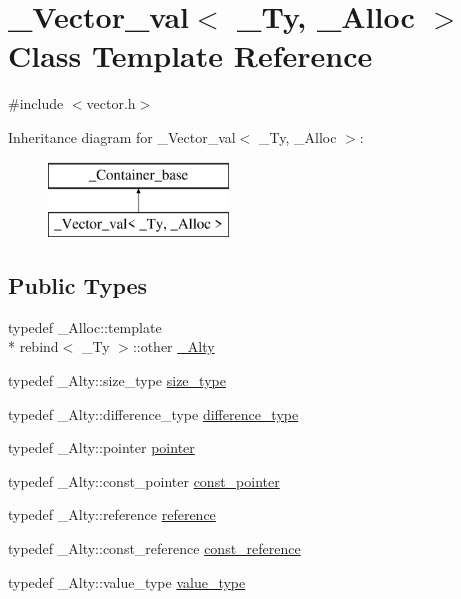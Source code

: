 \hypertarget{class___vector__val}{\section{\+\_\+\+Vector\+\_\+val$<$ \+\_\+\+Ty, \+\_\+\+Alloc $>$ Class Template Reference}
\label{class___vector__val}
}


{\ttfamily \#include $<$vector.\+h$>$}

Inheritance diagram for \+\_\+\+Vector\+\_\+val$<$ \+\_\+\+Ty, \+\_\+\+Alloc $>$\+:\begin{figure}[H]
\begin{center}
\leavevmode
\includegraphics[height=2.000000cm]{class___vector__val}
\end{center}
\end{figure}
\subsection*{Public Types}
\begin{DoxyCompactItemize}
\item 
typedef \+\_\+\+Alloc\+::template \\*
rebind$<$ \+\_\+\+Ty $>$\+::other \hyperlink{class___vector__val_ad273d1146bf265f65e75133aa2f9986a}{\+\_\+\+Alty}
\item 
typedef \+\_\+\+Alty\+::size\+\_\+type \hyperlink{class___vector__val_a46109be8e2eefdf86304a44e05074941}{size\+\_\+type}
\item 
typedef \+\_\+\+Alty\+::difference\+\_\+type \hyperlink{class___vector__val_ac80d6a645f27bc921bf30f5b0acdffb4}{difference\+\_\+type}
\item 
typedef \+\_\+\+Alty\+::pointer \hyperlink{class___vector__val_ae6cca5a50b243bc20bd27fa8f620d63e}{pointer}
\item 
typedef \+\_\+\+Alty\+::const\+\_\+pointer \hyperlink{class___vector__val_ab8b3d3a2093e4799ac46bf479e8789bb}{const\+\_\+pointer}
\item 
typedef \+\_\+\+Alty\+::reference \hyperlink{class___vector__val_a87f4bfea49b67e864cba8029a999eefe}{reference}
\item 
typedef \+\_\+\+Alty\+::const\+\_\+reference \hyperlink{class___vector__val_a0c18884755addbb2c0530338682d3506}{const\+\_\+reference}
\item 
typedef \+\_\+\+Alty\+::value\+\_\+type \hyperlink{class___vector__val_ad185b733a2aa2cd3df73e23303d5c43e}{value\+\_\+type}
\end{DoxyCompactItemize}
